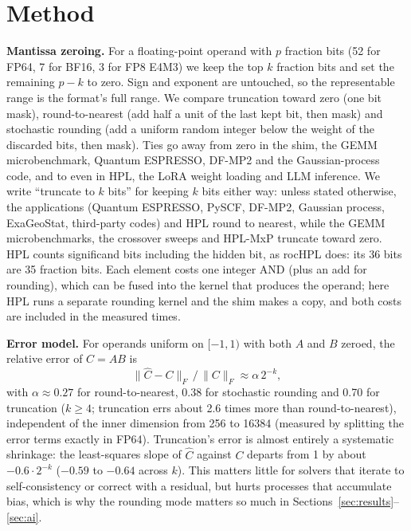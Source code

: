 \documentclass[conference]{IEEEtran}
\begin{document}
\section{Method}\label{sec:method}

\textbf{Mantissa zeroing.} For a floating-point operand with $p$ fraction bits (52 for FP64, 7 for BF16, 3 for FP8
E4M3) we keep the top $k$ fraction bits and set the remaining $p-k$ to zero. Sign and exponent are untouched, so
the representable range is the format's full range. We compare truncation toward zero (one bit mask),
round-to-nearest (add half a unit of the last kept bit, then mask) and stochastic rounding (add a uniform random
integer below the weight of the discarded bits, then mask). Ties go away from zero in the shim, the GEMM
microbenchmark, Quantum ESPRESSO, DF-MP2 and the Gaussian-process code, and to even in HPL, the LoRA weight loading
and LLM inference. We write ``truncate to $k$ bits'' for keeping $k$ bits either way: unless stated otherwise, the
applications (Quantum ESPRESSO, PySCF, DF-MP2, Gaussian process, ExaGeoStat, third-party codes) and HPL round to
nearest, while the GEMM microbenchmarks, the crossover sweeps and HPL-MxP truncate toward zero. HPL counts
significand bits including the hidden bit, as rocHPL does: its 36 bits are 35 fraction bits. Each element costs one
integer AND (plus an add for rounding), which can be fused into the kernel that produces the operand; here HPL runs
a separate rounding kernel and the shim makes a copy, and both costs are included in the measured times.

\textbf{Error model.} For operands uniform on $[-1,1)$ with both $A$ and $B$ zeroed, the relative error of $C=AB$ is
\begin{equation}
\lVert \hat C - C\rVert_F \,/\, \lVert C\rVert_F \approx \alpha\,2^{-k},
\end{equation}
with $\alpha\approx0.27$ for round-to-nearest, 0.38 for stochastic rounding and 0.70 for truncation ($k\ge4$;
truncation errs about 2.6 times more than round-to-nearest), independent of the inner dimension from 256 to 16384
(measured by splitting the error terms exactly in FP64). Truncation's error is almost entirely a systematic
shrinkage: the least-squares slope of $\hat C$ against $C$
departs from 1 by about $-0.6\cdot 2^{-k}$ ($-0.59$ to $-0.64$ across $k$). This matters little for solvers that
iterate to self-consistency or correct with a residual, but hurts processes that accumulate bias, which is why the
rounding mode matters so much in Sections~\ref{sec:results}--\ref{sec:ai}.
\end{document}
